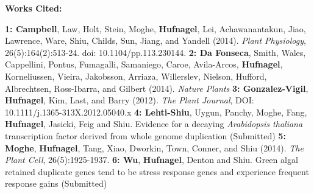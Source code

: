 \documentclass[12pt]{amsart}
\begin{document}
\small{
\hfill\break\textbf{Works Cited: }\hfill

\textbf{1: Campbell}, Law, Holt, Stein, Moghe, \textbf{Hufnagel}, Lei, Achawanantakun, Jiao, Lawrence, Ware, Shiu, Childs, Sun, Jiang, and Yandell (2014). \textit{Plant Physiology}, 26(5):164(2):513-24. doi: 10.1104/pp.113.230144.
\textbf{2: Da Fonseca}, Smith, Wales, Cappellini, Pontus, Fumagalli, Samaniego, Caroe, Avila-Arcos,  \textbf{Hufnagel}, Korneliussen, Vieira, Jakobsson, Arriaza, Willerslev, Nielson, Hufford, Albrechtsen, Ross-Ibarra,  and Gilbert (2014). \textit{Nature Plants}
\textbf{3: Gonzalez-Vigil}, \textbf{Hufnagel}, Kim, Last, and Barry  (2012). \textit{The Plant Journal}, DOI: 10.1111/j.1365-313X.2012.05040.x 
\textbf{4: Lehti-Shiu}, Uygun, Panchy, Moghe, Fang, \textbf{Hufnagel}, Jasicki, Feig and Shiu. Evidence for a decaying \textit{Arabidopsis thaliana} transcription factor derived from whole genome duplication (Submitted)
\textbf{5: Moghe}, \textbf{Hufnagel}, Tang, Xiao, Dworkin, Town, Conner, and Shiu (2014). \textit{The Plant Cell}, 26(5):1925-1937.
\textbf{6: Wu}, \textbf{Hufnagel}, Denton and Shiu. Green algal retained duplicate genes tend to be stress response genes and experience frequent response gains (Submitted)
}
\end{document}
